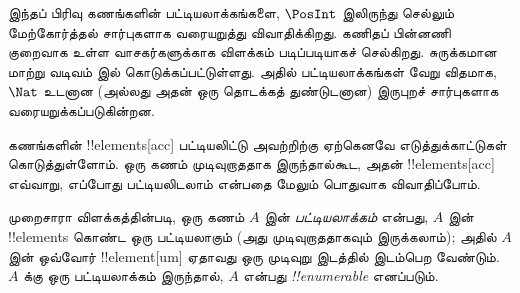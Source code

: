 \documentclass[../../../include/open-logic-section]{subfiles}
\begin{document}


\begin{editorial}
இந்தப் பிரிவு கணங்களின் பட்டியலாக்கங்களை,
$\PosInt$ இலிருந்து செல்லும் மேற்கோர்த்தல் சார்புகளாக வரையறுத்து
விவாதிக்கிறது. கணிதப் பின்னணி குறைவாக உள்ள வாசகர்களுக்காக
விளக்கம் படிப்படியாகச் செல்கிறது.
சுருக்கமான மாற்று வடிவம்  இல் கொடுக்கப்பட்டுள்ளது.
அதில் பட்டியலாக்கங்கள் வேறு விதமாக,
$\Nat$ உடனான (அல்லது அதன் ஒரு தொடக்கத் துண்டுடனான)
இருபுறச் சார்புகளாக வரையறுக்கப்படுகின்றன.
\end{editorial}

\begin{explain}
கணங்களின் !!{element}s[acc] பட்டியலிட்டு அவற்றிற்கு ஏற்கெனவே
எடுத்துக்காட்டுகள் கொடுத்துள்ளோம்.
ஒரு கணம் முடிவுறாததாக இருந்தால்கூட, அதன் !!{element}s[acc]
எவ்வாறு, எப்போது பட்டியலிடலாம் என்பதை மேலும் பொதுவாக விவாதிப்போம்.
\end{explain}

\begin{defn}[பட்டியலாக்கம் — முறைசாரா விளக்கம்]
முறைசாரா விளக்கத்தின்படி, ஒரு கணம் $A$ இன் \emph{பட்டியலாக்கம்}
என்பது, $A$ இன் !!{element}s கொண்ட ஒரு பட்டியலாகும்
(அது முடிவுறாததாகவும் இருக்கலாம்);
அதில் $A$ இன் ஒவ்வோர் !!{element}[um] ஏதாவது ஒரு முடிவுறு
இடத்தில் இடம்பெற வேண்டும்.
$A$ க்கு ஒரு பட்டியலாக்கம் இருந்தால்,
$A$ என்பது \emph{!!{enumerable}} எனப்படும்.
\end{defn}
\end{document}
